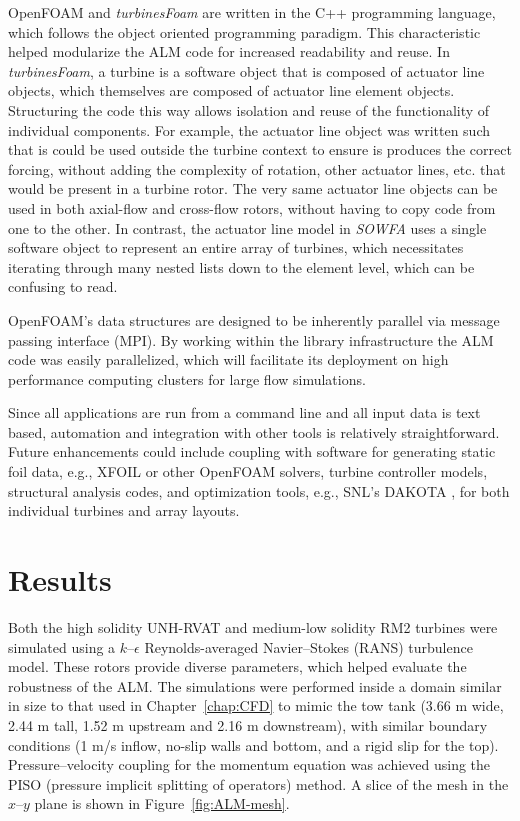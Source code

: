 OpenFOAM and \textit{turbinesFoam} are written in the C++ programming language,
which follows the object oriented programming paradigm. This characteristic
helped modularize the ALM code for increased readability and reuse. In
\textit{turbinesFoam}, a turbine is a software object that is composed of
actuator line objects, which themselves are composed of actuator line element
objects. Structuring the code this way allows isolation and reuse of the
functionality of individual components. For example, the actuator line object
was written such that is could be used outside the turbine context to ensure is
produces the correct forcing, without adding the complexity of rotation, other
actuator lines, etc. that would be present in a turbine rotor. The very same
actuator line objects can be used in both axial-flow and cross-flow rotors,
without having to copy code from one to the other. In contrast, the actuator
line model in \textit{SOWFA} uses a single software object to represent an
entire array of turbines, which necessitates iterating through many nested lists
down to the element level, which can be confusing to read.

OpenFOAM's data structures are designed to be inherently parallel via message
passing interface (MPI). By working within the library infrastructure the ALM
code was easily parallelized, which will facilitate its deployment on high
performance computing clusters for large flow simulations.

Since all applications are run from a command line and all input data is text
based, automation and integration with other tools is relatively
straightforward. Future enhancements could include coupling with software for
generating static foil data, e.g., XFOIL or other OpenFOAM solvers, turbine
controller models, structural analysis codes, and optimization tools, e.g.,
SNL's DAKOTA \cite{AdamsBaumanBohnhoffEtAl2009}, for both individual turbines
and array layouts.


\section{Results}

Both the high solidity UNH-RVAT and medium-low solidity RM2 turbines were
simulated using a $k$--$\epsilon$ Reynolds-averaged Navier--Stokes (RANS)
turbulence model. These rotors provide diverse parameters, which helped evaluate
the robustness of the ALM. The simulations were performed inside a domain
similar in size to that used in Chapter~\ref{chap:CFD} to mimic the tow tank
(3.66 m wide, 2.44 m tall, 1.52 m upstream and 2.16 m downstream), with similar
boundary conditions (1 m/s inflow, no-slip walls and bottom, and a rigid slip
for the top). Pressure--velocity coupling for the momentum equation was achieved
using the PISO (pressure implicit splitting of operators) method. A slice of the
mesh in the $x$--$y$ plane is shown in Figure~\ref{fig:ALM-mesh}.

